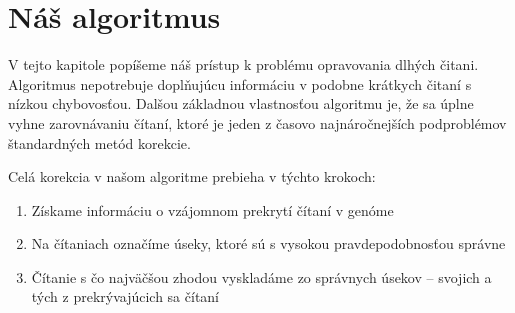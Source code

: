 \chapter{Náš algoritmus}

V tejto kapitole popíšeme náš prístup k problému opravovania dlhých čitani. Algoritmus nepotrebuje doplňujúcu informáciu v podobne krátkych čitaní s nízkou chybovosťou. Dalšou základnou vlastnosťou algoritmu je, že sa úplne vyhne zarovnávaniu čítaní, ktoré je jeden z časovo najnáročnejších podproblémov štandardných metód korekcie. 

Celá korekcia v našom algoritme prebieha v týchto krokoch:
\begin{enumerate}
\item Získame informáciu o vzájomnom prekrytí čítaní v genóme
\item Na čítaniach označíme úseky, ktoré sú s vysokou pravdepodobnosťou správne
\item Čítanie s čo najväčšou zhodou vyskladáme zo správnych úsekov -- svojich a tých z prekrývajúcich sa čítaní
\end{enumerate}





